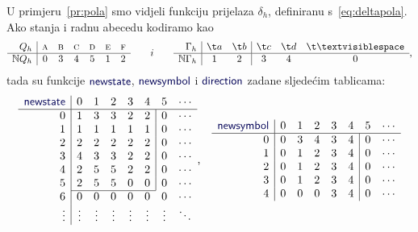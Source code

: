 \begin{primjer}
U primjeru~\ref{pr:pola} smo vidjeli funkciju prijelaza $\delta_h$, definiranu s~\eqref{eq:deltapola}. Ako stanja i radnu abecedu kodiramo kao
\begin{equation}
    \begin{array}{r|cccccc}
         Q_h& \textsc a& \textsc b& \textsc c& \textsc d& \textsc e& \textsc f \\\hline
         \N Q_h& 0 & 3 & 4 & 5 & 1 & 2
    \end{array}\qquad i\qquad
    \begin{array}{r|cc|ccc}
        \Gamma_h& \t a & \t b & \t c & \t d & \bl \\\hline
        \N\Gamma_h & 1 & 2 & 3 & 4 & 0
    \end{array}\text,
\end{equation}
tada su funkcije $\f{newstate}$, $\f{newsymbol}$ i $\f{direction}$ zadane sljedećim tablicama:
\begin{equation}
\begin{array}{r|ccccccc}
\f{newstate}&0&1&2&3&4&5&\cdots\\\hline
0& 1 & 3 & 3 & 2 & 2 & \multicolumn{1}{|c}{0} & \cdots\\
1& 1 & 1 & 1 & 1 & 1 & \multicolumn{1}{|c}{0} & \cdots\\
2& 2 & 2 & 2 & 2 & 2 & \multicolumn{1}{|c}{0} & \cdots\\
3& 4 & 3 & 3 & 2 & 2 & \multicolumn{1}{|c}{0} & \cdots\\
4& 2 & 5 & 5 & 2 & 2 & \multicolumn{1}{|c}{0} & \cdots\\
5& 2 & 5 & 5 & 0 & 0 & \multicolumn{1}{|c}{0} & \cdots\\ \cline{2-6}
6& 0 & 0 & 0 & 0 & 0 & 0 & \cdots\\
\vdots&\vdots&\vdots&\vdots&\vdots&\vdots&\vdots&\ddots
\end{array}\text,\quad
\begin{array}{r|ccccccc}
\f{newsymbol}&0&1&2&3&4&5&\cdots\\\hline
0& 0 & 3 & 4 & 3 & 4 & \multicolumn{1}{|c}{0} & \cdots\\
1& 0 & 1 & 2 & 3 & 4 & \multicolumn{1}{|c}{0} & \cdots\\
2& 0 & 1 & 2 & 3 & 4 & \multicolumn{1}{|c}{0} & \cdots\\
3& 0 & 1 & 2 & 3 & 4 & \multicolumn{1}{|c}{0} & \cdots\\
4& 0 & 0 & 0 & 3 & 4 & \multicolumn{1}{|c}{0} & \cdots\\

\end{array}
\end{equation}
\end{primjer}
